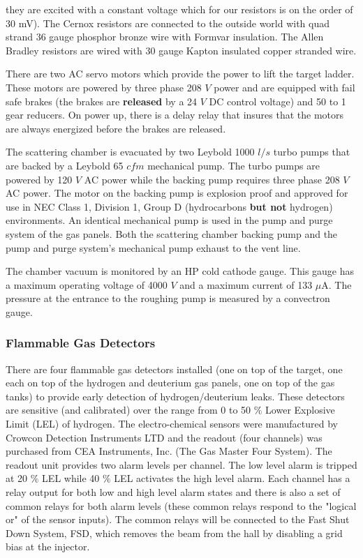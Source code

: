 {\begin{safetyen}{10}{5}
\begin{description}
they are excited with a constant voltage which for our resistors is
on the order of 30 mV). The Cernox resistors are connected to the outside world
with quad strand 36 gauge phosphor bronze wire with Formvar insulation.
The Allen Bradley resistors are wired with 30 gauge Kapton insulated 
copper stranded wire.
\item[{\bf Target Lifter}] There are two AC servo motors which provide
the power to lift the target ladder. These motors are powered by three
phase 208 $V$ power and are equipped with fail safe brakes (the brakes are
{\bf released} by a 24 $V$ DC control voltage)
and 50 to 1 gear reducers. On power up, there is a delay relay
that insures that
the motors are always energized before the brakes are released.
\item[{\bf Vacuum Pumps}] The scattering chamber is evacuated by two Leybold
1000 $l/s$ turbo pumps that are  backed by a Leybold 65 $cfm$
mechanical pump. The turbo pumps are powered by 120 $V$ AC power while the
backing pump requires three phase 208 $V$ AC power. The motor on the backing 
pump is explosion proof and approved for use in NEC Class 1, Division 1,
Group D (hydrocarbons {\bf but not} hydrogen) environments. An identical
mechanical pump is used in the pump and purge system of the gas panels.
Both the scattering chamber backing pump and the
pump and purge system's mechanical pump exhaust to the vent line. 
\item[{\bf Vacuum Gauges}] The chamber vacuum is monitored by an
HP cold cathode gauge. This gauge has a maximum operating voltage of 
4000 $V$ and a maximum
current of 133 $\mu$A. The pressure at the entrance to the roughing pump
is measured by a convectron gauge.
\end{description}

\subsubsection{ Flammable Gas Detectors}

There are four flammable gas detectors installed (one on top of the target,
one each on top of the hydrogen and deuterium gas panels, one on top of the gas
tanks)
to provide early detection
of hydrogen/deuterium leaks. These detectors are sensitive (and calibrated)
over the range from 0 to 50 $\%$ Lower Explosive Limit (LEL) of hydrogen.
The electro-chemical sensors were manufactured by Crowcon Detection
Instruments LTD and
the readout (four channels) was purchased from CEA Instruments, Inc. 
(The Gas Master Four System). The readout unit provides two alarm
levels per channel. The low level alarm is tripped at 20 $\%$ LEL
while 40 $\%$ LEL activates the high level alarm.
Each channel has a relay output for both low and high level alarm
states and there is also a set of common relays for both alarm
levels (these common relays respond to the "logical or" of the sensor inputs).
The common relays will be connected to the Fast Shut Down System, FSD,
which removes the beam from the hall by disabling a grid bias at the
injector.
\end{safetyen}
}

